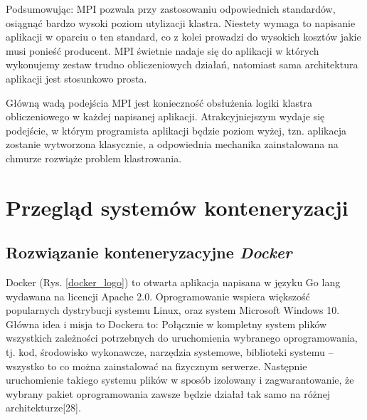 \documentclass[10pt,a4paper,titlepage,twoside]{report}
\begin{document}
Podsumowując: MPI pozwala przy zastosowaniu odpowiednich standardów, osiągnąć bardzo wysoki poziom utylizacji klastra. Niestety wymaga to napisanie aplikacji w oparciu o ten standard, co z kolei prowadzi do wysokich kosztów jakie musi ponieść producent. MPI świetnie nadaje się do aplikacji w których wykonujemy zestaw trudno obliczeniowych działań, natomiast sama architektura aplikacji jest stosunkowo prosta.

Główną wadą podejścia MPI jest konieczność obsłużenia logiki klastra obliczeniowego w każdej napisanej aplikacji. Atrakcyjniejszym wydaje się podejście, w którym programista aplikacji będzie poziom wyżej, tzn. aplikacja zostanie wytworzona klasycznie, a odpowiednia mechanika zainstalowana na chmurze rozwiąże problem klastrowania.

\section{Przegląd systemów konteneryzacji}
\subsection{Rozwiązanie konteneryzacyjne \textit{Docker}}
\indent \indent Docker (Rys. \ref{docker_logo}) to otwarta aplikacja napisana w języku Go lang wydawana na licencji Apache 2.0. Oprogramowanie wspiera większość popularnych dystrybucji systemu Linux, oraz system Microsoft Windows 10. Główna idea i misja to Dockera to: Połącznie w kompletny system plików wszystkich zależności potrzebnych do uruchomienia wybranego oprogramowania, tj. kod, środowisko wykonawcze, narzędzia systemowe, biblioteki systemu – wszystko to co można zainstalować na fizycznym serwerze. Następnie uruchomienie takiego systemu plików w sposób izolowany i zagwarantowanie, że wybrany pakiet oprogramowania zawsze będzie działał tak samo na różnej architekturze[28].
\end{document}
